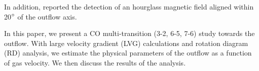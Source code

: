 In addition, \citet{2014ApJ...794L..18Q} reported the detection of an hourglass magnetic field aligned within 20${\mbox{$^\circ$}}$ of the outflow axis.

In this paper, we present a CO multi-transition (3-2, 6-5, 7-6) study towards the  outflow. With large velocity gradient (LVG) calculations and rotation diagram (RD) analysis, we estimate the physical parameters of the outflow as a function of gas velocity. We then discuss the results of the analysis.


